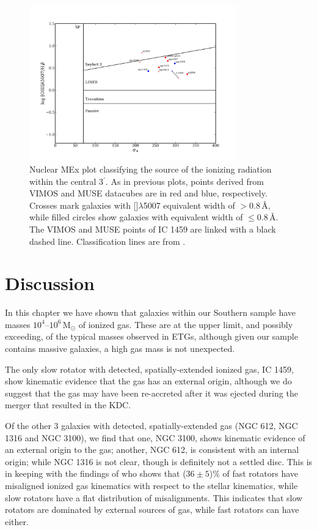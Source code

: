 		\begin{figure}
			\centering
			\includegraphics[width=0.8\textwidth]{chapter5/nuclear_MEx.png}
			\caption[Nuclear mass--excitation plot]{Nuclear MEx plot classifying the source of the ionizing radiation within the central 3$^\prime$. As in previous plots, points derived from VIMOS and MUSE datacubes are in red and blue, respectively. Crosses mark galaxies with []$\lambda$5007 equivalent width of $> 0.8$\,\AA, while filled circles show galaxies with equivalent width of $\leqslant 0.8$\,\AA. The VIMOS and MUSE points of IC 1459 are linked with a black dashed line. Classification lines are from \citet{Nyland2016}.}
			\label{fig:MEx}
		\end{figure}


\section{Discussion}
	\label{sec:gasDiscussion}
	In this chapter we have shown that galaxies within our Southern sample have masses $10^4$--$10^6\,\mathrm{M_\odot}$ of ionized gas. These are at the upper limit, and possibly exceeding, of the typical masses observed in ETGs, although given our sample contains massive galaxies, a high gas mass is not unexpected. 

	The only slow rotator with detected, spatially-extended ionized gas, IC 1459, show kinematic evidence that the gas has an external origin, although we do suggest that the gas may have been re-accreted after it was ejected during the merger that resulted in the KDC. 

	Of the other 3 galaxies with detected, spatially-extended gas (NGC 612, NGC 1316 and NGC 3100), we find that one, NGC 3100, shows kinematic evidence of an external origin to the gas; another, NGC 612, is consistent with an internal origin; while NGC 1316 is not clear, though is definitely not a settled disc. This is in keeping with the findings of \citet{Davis2011a} who shows that ($36\pm5$)\% of fast rotators have misaligned ionized gas kinematics with respect to the stellar kinematics, while slow rotators have a flat distribution of misalignments. This indicates that slow rotators are dominated by external sources of gas, while fast rotators can have either. 

